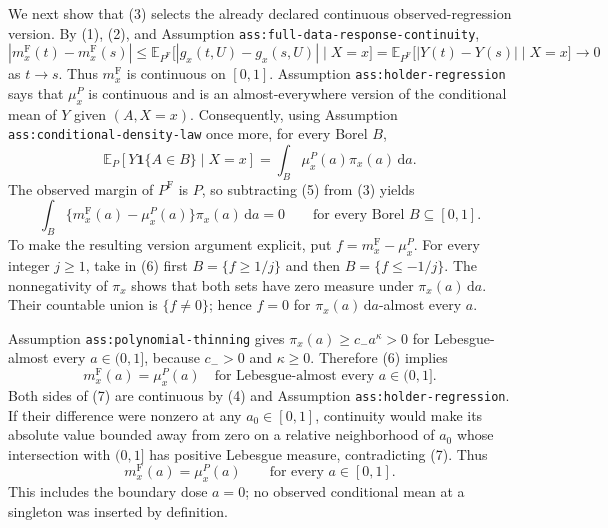 We next show that (3) selects the already declared continuous observed-regression version.  By (1), (2), and Assumption \texttt{ass:full-data-response-continuity},
\[
 \left|m_x^{\mathrm F}(t)-m_x^{\mathrm F}(s)\right|
 \leq
 \mathbb E_{P^{\mathrm F}}
 \bigl[|g_x(t,U)-g_x(s,U)|\mid X=x\bigr]
 =\mathbb E_{P^{\mathrm F}}
 \bigl[|Y(t)-Y(s)|\mid X=x\bigr]
 \longrightarrow0
 \tag{4}
\]
as \(t\to s\).  Thus \(m_x^{\mathrm F}\) is continuous on \([0,1]\).  Assumption \texttt{ass:holder-regression} says that \(\mu_x^P\) is continuous and is an almost-everywhere version of the conditional mean of \(Y\) given \((A,X=x)\).  Consequently, using Assumption \texttt{ass:conditional-density-law} once more, for every Borel \(B\),
\[
 \mathbb E_P[Y\mathbf 1\{A\in B\}\mid X=x]
 =\int_B\mu_x^P(a)\pi_x(a)\,\mathrm da.
 \tag{5}
\]
The observed margin of \(P^{\mathrm F}\) is \(P\), so subtracting (5) from (3) yields
\[
 \int_B\{m_x^{\mathrm F}(a)-\mu_x^P(a)\}\pi_x(a)\,\mathrm da=0
 \qquad\text{for every Borel }B\subseteq[0,1].
 \tag{6}
\]
To make the resulting version argument explicit, put \(f=m_x^{\mathrm F}-\mu_x^P\).  For every integer \(j\geq1\), take in (6) first \(B=\{f\geq1/j\}\) and then \(B=\{f\leq-1/j\}\).  The nonnegativity of \(\pi_x\) shows that both sets have zero measure under \(\pi_x(a)\,\mathrm da\).  Their countable union is \(\{f\neq0\}\); hence \(f=0\) for \(\pi_x(a)\,\mathrm da\)-almost every \(a\).

Assumption \texttt{ass:polynomial-thinning} gives \(\pi_x(a)\geq c_-a^\kappa>0\) for Lebesgue-almost every \(a\in(0,1]\), because \(c_->0\) and \(\kappa\geq0\).  Therefore (6) implies
\[
 m_x^{\mathrm F}(a)=\mu_x^P(a)
 \quad\text{for Lebesgue-almost every }a\in(0,1].
 \tag{7}
\]
Both sides of (7) are continuous by (4) and Assumption \texttt{ass:holder-regression}.  If their difference were nonzero at any \(a_0\in[0,1]\), continuity would make its absolute value bounded away from zero on a relative neighborhood of \(a_0\) whose intersection with \((0,1]\) has positive Lebesgue measure, contradicting (7).  Thus
\[
 m_x^{\mathrm F}(a)=\mu_x^P(a)
 \qquad\text{for every }a\in[0,1].
 \tag{8}
\]
This includes the boundary dose \(a=0\); no observed conditional mean at a singleton was inserted by definition.

